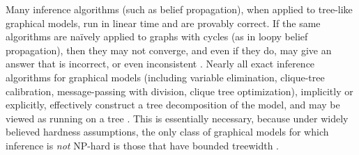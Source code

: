 \documentclass[twoside]{article}
\begin{document}
Many inference algorithms (such as belief propagation),
when applied to tree-like graphical models,
run in linear time and are provably correct.
If the same algorithms are na{\"i}vely applied to graphs with cycles (as in loopy belief propagation),
then they may not converge, and even if they do,
may give an answer that is incorrect, or even inconsistent \parencite{wainwright2008graphical}.
Nearly all exact inference algorithms for graphical models (including variable elimination, clique-tree calibration, message-passing with division, clique tree optimization),
implicitly or explicitly, effectively construct a tree decomposition of the model, and may be viewed as running on a tree \parencite[\S9-11]{koller2009probabilistic}.
This is essentially necessary, because under widely believed
hardness assumptions, the only class of graphical models for which inference is \emph{not} NP-hard is those that have bounded treewidth \parencite{chandrasekaran2012complexity}.
\end{document}
